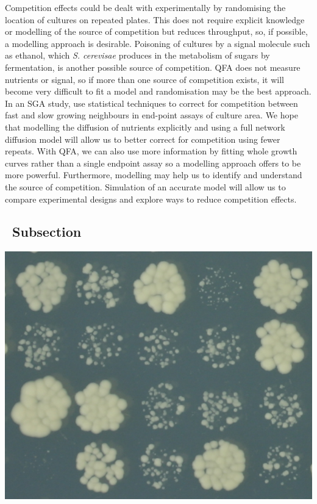 Competition effects could be dealt with experimentally by randomising
the location of cultures on repeated plates. This does not require
explicit knowledge or modelling of the source of competition but
reduces throughput, so, if possible, a modelling approach is
desirable. Poisoning of cultures by a signal molecule such as ethanol,
which \textit{S. cerevisae} produces in the metabolism of sugars by
fermentation, is another possible source of competition. QFA does not
measure nutrients or signal, so if more than one source of competition
exists, it will become very difficult to fit a model and randomisation
may be the best approach.  In an SGA study, \citet{Baryshnikova2010}
use statistical techniques to correct for competition between fast and
slow growing neighbours in end-point assays of culture area. We hope
that modelling the diffusion of nutrients explicitly and using a full
network diffusion model will allow us to better correct for
competition using fewer repeats. With QFA, we can also use more
information by fitting whole growth curves rather than a single
endpoint assay so a modelling approach offers to be more
powerful. Furthermore, modelling may help us to identify and
understand the source of competition. Simulation of an accurate model
will allow us to compare experimental designs and explore ways to
reduce competition effects.








\subsection{\thesubsection~Subsection}

\begin{Figure}
  \centering
  \includegraphics[width=\linewidth]{p15_section/p15_section}
  \label{fig:p15_section}
\end{Figure}



